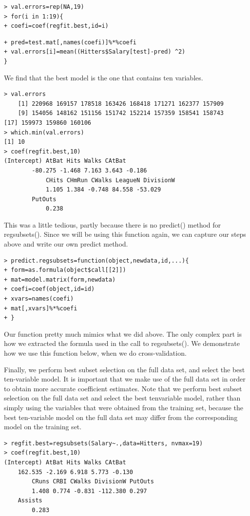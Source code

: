 \documentclass[10pt]{article}
\begin{document}
\begin{verbatim}
> val.errors=rep(NA,19)
> for(i in 1:19){
+ coefi=coef(regfit.best,id=i)
\end{verbatim}

\begin{verbatim}
+ pred=test.mat[,names(coefi)]%*%coefi
+ val.errors[i]=mean((Hitters$Salary[test]-pred) ^2)
}
\end{verbatim}

We find that the best model is the one that contains ten variables.

\begin{verbatim}
> val.errors
    [1] 220968 169157 178518 163426 168418 171271 162377 157909
    [9] 154056 148162 151156 151742 152214 157359 158541 158743
[17] 159973 159860 160106
> which.min(val.errors)
[1] 10
> coef(regfit.best,10)
(Intercept) AtBat Hits Walks CAtBat
        -80.275 -1.468 7.163 3.643 -0.186
            CHits CHmRun CWalks LeagueN DivisionW
            1.105 1.384 -0.748 84.558 -53.029
        PutOuts
            0.238
\end{verbatim}

This was a little tedious, partly because there is no predict() method for regsubsets(). Since we will be using this function again, we can capture our steps above and write our own predict method.

\begin{verbatim}
> predict.regsubsets=function(object,newdata,id,...){
+ form=as.formula(object$call[[2]])
+ mat=model.matrix(form,newdata)
+ coefi=coef(object,id=id)
+ xvars=names(coefi)
+ mat[,xvars]%*%coefi
+ }
\end{verbatim}

Our function pretty much mimics what we did above. The only complex part is how we extracted the formula used in the call to regsubsets(). We demonstrate how we use this function below, when we do cross-validation.

Finally, we perform best subset selection on the full data set, and select the best ten-variable model. It is important that we make use of the full data set in order to obtain more accurate coefficient estimates. Note that we perform best subset selection on the full data set and select the best tenvariable model, rather than simply using the variables that were obtained from the training set, because the best ten-variable model on the full data set may differ from the corresponding model on the training set.

\begin{verbatim}
> regfit.best=regsubsets(Salary~.,data=Hitters, nvmax=19)
> coef(regfit.best,10)
(Intercept) AtBat Hits Walks CAtBat
    162.535 -2.169 6.918 5.773 -0.130
        CRuns CRBI CWalks DivisionW PutOuts
        1.408 0.774 -0.831 -112.380 0.297
    Assists
        0.283
\end{verbatim}
\end{document}
